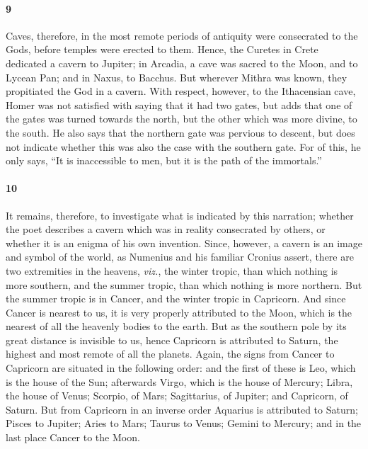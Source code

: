 \documentclass[12pt]{article}
\begin{document}
\paragraph{9} Caves, therefore, in the most remote periods of antiquity were
consecrated to the Gods, before temples were erected to them. Hence, the
Curetes in Crete dedicated a cavern to Jupiter; in Arcadia, a cave was sacred
to the Moon, and to Lycean Pan; and in Naxus, to Bacchus. But wherever Mithra
was known, they propitiated the God in a cavern. With respect, however, to the
Ithacensian cave, Homer was not satisfied with saying that it had two gates,
but adds that one of the gates was turned towards the north, but the other
which was more divine, to the south. He also says that the northern gate was
pervious to descent, but does not indicate whether this was also the case with
the southern gate. For of this, he only says, ``It is inaccessible to men, but
it is the path of the immortals.''


\paragraph{10} It remains, therefore, to investigate what is indicated by this
narration; whether the poet describes a cavern which was in reality consecrated
by others, or whether it is an enigma of his own invention. Since, however, a
cavern is an image and symbol of the world, as Numenius and his familiar
Cronius assert, there are two extremities in the heavens, \textit{viz.}, the winter
tropic, than which nothing is more southern, and the summer tropic, than which
nothing is more northern. But the summer tropic is in Cancer, and the winter
tropic in Capricorn. And since Cancer is nearest to us, it is very properly
attributed to the Moon, which is the nearest of all the heavenly bodies to the
earth. But as the southern pole by its great distance is invisible to us, hence
Capricorn is attributed to Saturn, the highest and most remote of all the
planets. Again, the signs from Cancer to Capricorn are situated in the
following order: and the first of these is Leo, which is the house of the Sun;
afterwards Virgo, which is the house of Mercury; Libra, the house of Venus;
Scorpio, of Mars; Sagittarius, of Jupiter; and Capricorn, of Saturn. But from
Capricorn in an inverse order Aquarius is attributed to Saturn; Pisces to
Jupiter; Aries to Mars; Taurus to Venus; Gemini to Mercury; and in the last
place Cancer to the Moon.
\end{document}
